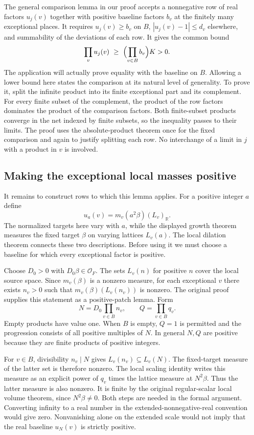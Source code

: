 \documentclass[12pt,letterpaper]{article}
\begin{document}
The general comparison lemma in our proof accepts a nonnegative row of real factors $u_j(v)$ together with positive baseline factors $b_v$ at the finitely many exceptional places. It requires $u_j(v)\geq b_v$ on $B$, $|u_j(v)-1|\leq d_v$ elsewhere, and summability of the deviations of each row. It gives the common bound
\[
       \prod_v u_j(v)\ \geq\
              \Bigl(\prod_{v\in B} b_v\Bigr)K>0 .
\]
The application will actually prove equality with the baseline on $B$. Allowing a lower bound here states the comparison at its natural level of generality. To prove it, split the infinite product into its finite exceptional part and its complement. For every finite subset of the complement, the product of the row factors dominates the product of the comparison factors. Both finite-subset products converge in the net indexed by finite subsets, so the inequality passes to their limits. The proof uses the absolute-product theorem once for the fixed comparison and again to justify splitting each row. No interchange of a limit in $j$ with a product in $v$ is involved.

\subsection{Making the exceptional local masses positive}

It remains to construct rows to which this lemma applies. For a positive integer $a$ define
\[
                 u_a(v)=m_v(a^2\beta)(L_v)_{\mathbb R}.
\]
The normalized targets here vary with $a$, while the displayed growth theorem measures the fixed target $\beta$ on varying lattices $L_v(a)$. The local dilation theorem connects these two descriptions. Before using it we must choose a baseline for which every exceptional factor is positive.

Choose $D_0>0$ with $D_0\beta\in\mathcal O_F$. The sets $L_v(n)$ for positive $n$ cover the local source space. Since $m_v(\beta)$ is a nonzero measure, for each exceptional $v$ there exists $n_v>0$ such that $m_v(\beta)(L_v(n_v))$ is nonzero. The original proof supplies this statement as a positive-patch lemma. Form
\[
             N=D_0\prod_{v\in B}n_v,\qquad
             Q=\prod_{v\in B}q_v .
\]
Empty products have value one. When $B$ is empty, $Q=1$ is permitted and the progression consists of all positive multiples of $N$. In general $N,Q$ are positive because they are finite products of positive integers.

For $v\in B$, divisibility $n_v\mid N$ gives $L_v(n_v)\subseteq L_v(N)$. The fixed-target measure of the latter set is therefore nonzero. The local scaling identity writes this measure as an explicit power of $q_v$ times the lattice measure at $N^2\beta$. Thus the latter measure is also nonzero. It is finite by the original regular-scalar local volume theorem, since $N^2\beta\ne0$. Both steps are needed in the formal argument. Converting infinity to a real number in the extended-nonnegative-real convention would give zero. Nonvanishing alone on the extended scale would not imply that the real baseline $u_N(v)$ is strictly positive.
\end{document}
